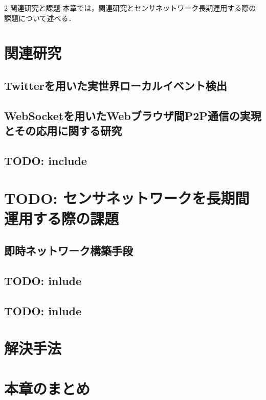\chapterhead
{2}
{関連研究と課題}
{本章では，関連研究とセンサネットワーク長期運用する際の課題について述べる．}

\section{関連研究}

\newpage

\subsection{Twitterを用いた実世界ローカルイベント検出}

\newpage

\subsection{WebSocketを用いたWebブラウザ間P2P通信の実現とその応用に関する研究}

\newpage

\subsection{TODO: include}

\newpage

\section{TODO: センサネットワークを長期間運用する際の課題}

\subsection{即時ネットワーク構築手段}

\newpage

\subsection{TODO: inlude}

\subsection{TODO: inlude}

\newpage

\section{解決手法}

\section{本章のまとめ}
